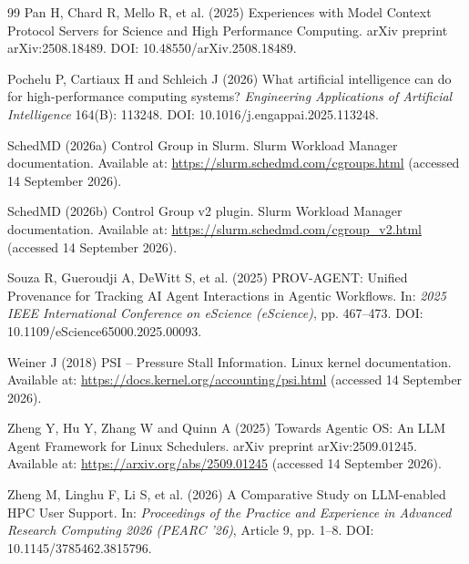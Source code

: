 \documentclass[11pt]{article}
\begin{document}
\begin{thebibliography}{99}
Pan H, Chard R, Mello R, et al. (2025) Experiences with Model Context Protocol Servers for Science and High Performance Computing. arXiv preprint arXiv:2508.18489. DOI: 10.48550/arXiv.2508.18489.

Pochelu P, Cartiaux H and Schleich J (2026) What artificial intelligence can do for high-performance computing systems? \textit{Engineering Applications of Artificial Intelligence} 164(B): 113248. DOI: 10.1016/j.engappai.2025.113248.

SchedMD (2026a) Control Group in Slurm. Slurm Workload Manager documentation. Available at: \url{https://slurm.schedmd.com/cgroups.html} (accessed 14 September 2026).

SchedMD (2026b) Control Group v2 plugin. Slurm Workload Manager documentation. Available at: \url{https://slurm.schedmd.com/cgroup_v2.html} (accessed 14 September 2026).

Souza R, Gueroudji A, DeWitt S, et al. (2025) PROV-AGENT: Unified Provenance for Tracking AI Agent Interactions in Agentic Workflows. In: \textit{2025 IEEE International Conference on eScience (eScience)}, pp. 467--473. DOI: 10.1109/eScience65000.2025.00093.

Weiner J (2018) PSI -- Pressure Stall Information. Linux kernel documentation. Available at: \url{https://docs.kernel.org/accounting/psi.html} (accessed 14 September 2026).

Zheng Y, Hu Y, Zhang W and Quinn A (2025) Towards Agentic OS: An LLM Agent Framework for Linux Schedulers. arXiv preprint arXiv:2509.01245. Available at: \url{https://arxiv.org/abs/2509.01245} (accessed 14 September 2026).

Zheng M, Linghu F, Li S, et al. (2026) A Comparative Study on LLM-enabled HPC User Support. In: \textit{Proceedings of the Practice and Experience in Advanced Research Computing 2026 (PEARC '26)}, Article 9, pp. 1--8. DOI: 10.1145/3785462.3815796.

\end{thebibliography}
\end{document}
